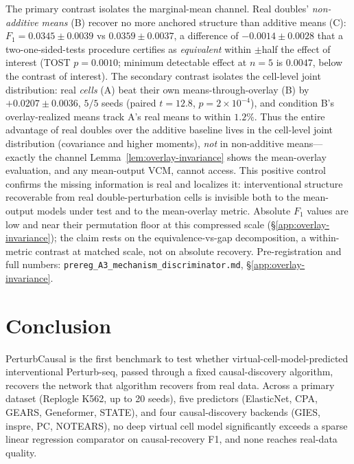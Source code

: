 \documentclass{article}
\theoremstyle{plain}
\theoremstyle{definition}
\theoremstyle{remark}
\begin{document}
The primary contrast isolates the marginal-mean channel. Real doubles' \emph{non-additive means} (B) recover no more anchored structure than additive means (C): $F_1 = 0.0345 \pm 0.0039$ vs $0.0359 \pm 0.0037$, a difference of $-0.0014 \pm 0.0028$ that a two-one-sided-tests procedure certifies as \emph{equivalent} within $\pm$half the effect of interest (TOST $p = 0.0010$; minimum detectable effect at $n{=}5$ is $0.0047$, below the contrast of interest). The secondary contrast isolates the cell-level joint distribution: real \emph{cells} (A) beat their own means-through-overlay (B) by $+0.0207 \pm 0.0036$, $5/5$ seeds (paired $t = 12.8$, $p = 2\times10^{-4}$), and condition B's overlay-realized means track A's real means to within $1.2\%$. Thus the entire advantage of real doubles over the additive baseline lives in the cell-level joint distribution (covariance and higher moments), \emph{not} in non-additive means---exactly the channel Lemma~\ref{lem:overlay-invariance} shows the mean-overlay evaluation, and any mean-output VCM, cannot access. This positive control confirms the missing information is real and localizes it: interventional structure recoverable from real double-perturbation cells is invisible both to the mean-output models under test and to the mean-overlay metric. Absolute $F_1$ values are low and near their permutation floor at this compressed scale (\S\ref{app:overlay-invariance}); the claim rests on the equivalence-vs-gap decomposition, a within-metric contrast at matched scale, not on absolute recovery. Pre-registration and full numbers: \texttt{prereg\_A3\_mechanism\_discriminator.md}, \S\ref{app:overlay-invariance}.

\section{Conclusion}
\label{sec:conclusion}

PerturbCausal is the first benchmark to test whether virtual-cell-model-predicted interventional Perturb-seq, passed through a fixed causal-discovery algorithm, recovers the network that algorithm recovers from real data. Across a primary dataset (Replogle K562, up to 20 seeds), five predictors (ElasticNet, CPA, GEARS, Geneformer, STATE), and four causal-discovery backends (GIES, inspre, PC, NOTEARS), no deep virtual cell model significantly exceeds a sparse linear regression comparator on causal-recovery F1, and none reaches real-data quality.
\end{document}
